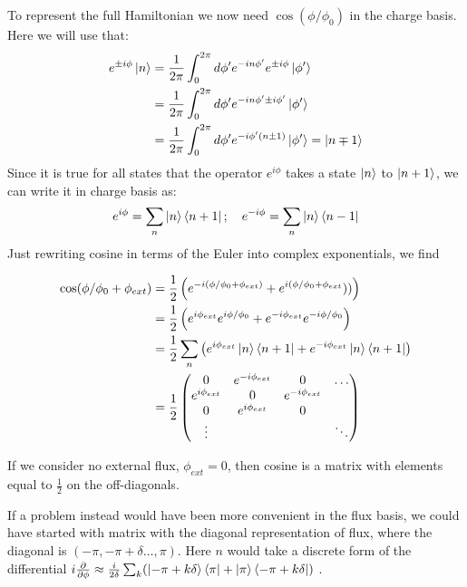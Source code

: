 To represent the full Hamiltonian we now need $\cos(\phi / \phi_0)$ in the charge basis. Here we will use that:
\begin{align*}
    e^{\pm i \phi}\ket{n} &= \frac{1}{2\pi} \int_0^{2\pi} d \phi' e^{-in\phi'} e^{\pm i \phi}\ket{\phi'} \\
                                &=  \frac{1}{2\pi} \int_0^{2\pi} d \phi' e^{-in\phi'\pm i \phi'} \ket{\phi'} \\
                                &=  \frac{1}{2\pi} \int_0^{2\pi} d \phi' e^{-i\phi'(n\pm 1)} \ket{\phi'} = \ket{n\mp 1}\\                                
\end{align*}
Since it is true for all states that the operator $e^{i\phi}$ takes a state $\ket{n}$ to $\ket{n+1}$, we can write it in charge basis as:
\begin{equation}
    e^{i\phi} = \sum_n \ket{n}\bra{n+1}; \quad e^{-i\phi} = \sum_n  \ket{n}\bra{n-1}
\end{equation}
Just rewriting cosine in terms of the Euler into complex exponentials, we find 
\begin{fullwidth}
\begin{align}
    \cos(\phi/\phi_0 + \phi_{ext}) &= \frac12 \left(e^{-i(\phi/\phi_0 + \phi_{ext})} + e^{i(\phi/\phi_0 + \phi_{ext}}))\right) \\
    &= \frac12 \left(e^{i\phi_{ext}}e^{i\phi/\phi_0} + e^{-i\phi_{ext}}e^{-i\phi/\phi_0}\right)  \\
    &= \frac12 \sum_n \left(e^{i\phi_{ext}} \ket{n}\bra{n + 1} + e^{-i\phi_{ext}} \ket{n}\bra{n+ 1}   \right) \\
    &= \frac12 \begin{pmatrix}
        0 & e^{-i\phi_{ext}} & 0 & \hdots \\
        e^{i\phi_{ext}} & 0 & e^{-i\phi_{ext}} \\
        0 & e^{i\phi_{ext}} & 0 & \\
        \vdots & & & \ddots 
    \end{pmatrix}
\end{align}
\end{fullwidth}
If we consider no external flux, $\phi_{ext} = 0$, then cosine is a matrix with elements equal to $\frac12$ on the off-diagonals. 

If a problem instead would have been more convenient in the flux basis, we could have started with matrix with the diagonal representation of flux, where the diagonal is $(-\pi, -\pi + \delta \dots, \pi)$. Here $n$ would take a discrete form of the differential $i\frac{\partial }{\partial \phi} \approx \frac{i}{2\delta} \sum_k (\ket{-\pi + k\delta}\bra{\pi} + \ket{\pi}\bra{-\pi + k\delta})$ \cite{aumann_circuitq_2022}.

